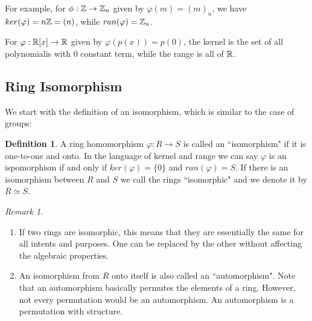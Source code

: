 \documentclass[12pt]{article}
\theoremstyle{plain}
\theoremstyle{definition}
\newtheorem{definition}{Definition}
\theoremstyle{remark}
\newtheorem{remark}{Remark}
\begin{document}
For example, for $\phi:\mathbb{Z} \rightarrow \mathbb{Z}_n$ given by $\varphi(m)=(m)_n$, we have $ker(\varphi) = n\mathbb{Z} = (n)$, while $ran(\varphi) = \mathbb{Z}_n$.

For $\varphi:\mathbb{R}[x]\rightarrow \mathbb{R}$ given by $\varphi(p(x))=p(0)$, the kernel is the set of all polynomialis with $0$ constant term, while the range is all of $\mathbb{R}$.

\subsection{Ring Isomorphism}
We start with the definition of an isomorphism, which is similar to the case of groups:
\begin{definition}
A ring homomorphism $\varphi:R\rightarrow S$ is called an ``isomorphism" if it is one-to-one and onto. In the language of kernel and range we can say $\varphi$ is an ispomorphism if and only if $ker(\varphi)=\{0\}$ and $ran(\varphi)=S$.
 If there is an isomorphism between $R$ and $S$ we call the rings ``isomorphic" and we denote it by $R\simeq S$.
\end{definition}
\begin{remark}
\begin{enumerate}
    \item If two rings are isomorphic, this means that they are essentially the same for all intents and purposes. One can be replaced by the other without affecting the algebraic properties.
    \item An isomorphism from $R$ onto itself is also called an ``automorphism". Note that an automorphism basically permutes the elements of a ring. However, not every permutation would be an automorphism. An automorphism is a permutation with structure.
\end{enumerate}
\end{remark}
\end{document}

